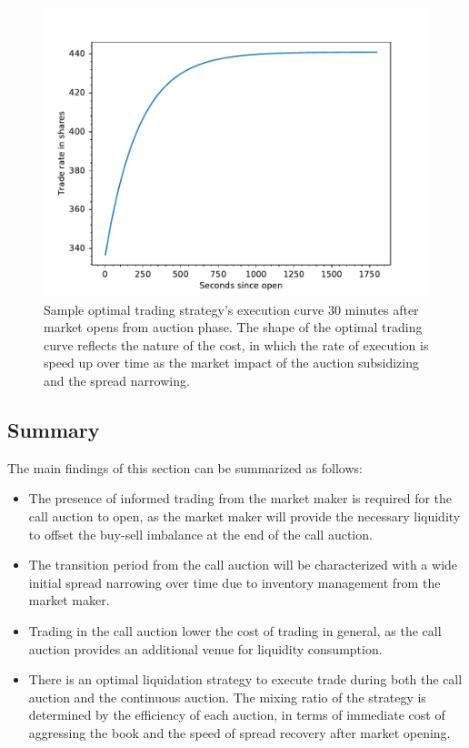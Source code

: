 \documentclass{article}
\begin{document}


\begin{figure}[h]
  \includegraphics[width=\textwidth]{SampleTradeCurve}
  \caption{Sample optimal trading strategy's execution curve 30 minutes after market opens from auction phase. The shape of the optimal trading curve reflects the nature of the cost, in which the rate of execution is speed up over time as the market impact of the auction subsidizing and the spread narrowing.}
  \label{fig:optimal_curve_strategy}
\end{figure}

\subsection{Summary}

The main findings of this section can be summarized as follows:

\begin{itemize}
  \item The presence of informed trading from the market maker is required for the call auction to open, as the market maker will provide the necessary liquidity to offset the buy-sell imbalance at the end of the call auction.
  \item The transition period from the call auction will be characterized with a wide initial spread narrowing over time due to inventory management from the market maker.
  \item Trading in the call auction lower the cost of trading in general, as the call auction provides an additional venue for liquidity consumption.
  \item There is an optimal liquidation strategy to execute trade during both the call auction and the continuous auction. The mixing ratio of the strategy is determined by the efficiency of each auction, in terms of immediate cost of aggressing the book and the speed of spread recovery after market opening.
\end{itemize}
\end{document}
